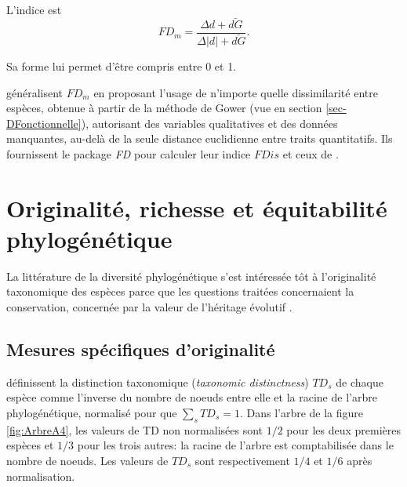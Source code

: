 \documentclass[
  11pt,
  french,
  a4paper,
  extrafontsizes,onecolumn,openright
  ]{memoir}
\begin{document}
L'indice est
\begin{equation}
  \label{eq:FDm}
  \mathit{FD}_{m} = \frac{\Delta d + \bar{dG}}{\Delta |d| +\bar{dG}}.
\end{equation}

Sa forme lui permet d'être compris entre 0 et 1.

\textcite{Laliberte2010} généralisent \(\mathit{FD}_{m}\) en proposant l'usage de n'importe quelle dissimilarité entre espèces, obtenue à partir de la méthode de Gower (vue en section \ref{sec-DFonctionnelle}), autorisant des variables qualitatives et des données manquantes, au-delà de la seule distance euclidienne entre traits quantitatifs.
Ils fournissent le package \emph{FD} pour calculer leur indice \(\mathit{FDis}\) et ceux de
\textcite{Villeger2008a}.

\hypertarget{originalituxe9-richesse-et-uxe9quitabilituxe9-phyloguxe9nuxe9tique}{%
\section{Originalité, richesse et équitabilité phylogénétique}\label{originalituxe9-richesse-et-uxe9quitabilituxe9-phyloguxe9nuxe9tique}}

La littérature de la diversité phylogénétique s'est intéressée tôt à l'originalité taxonomique des espèces parce que les questions traitées concernaient la conservation, concernée par la valeur de l'héritage évolutif \autocite{Faith2008}.

\hypertarget{mesures-spuxe9cifiques-doriginalituxe9}{%
\subsection{Mesures spécifiques d'originalité}\label{mesures-spuxe9cifiques-doriginalituxe9}}

\textcite{Vane-Wright1991} définissent la distinction taxonomique (\emph{taxonomic distinctness}) \(\mathit{TD}_s\) de chaque espèce comme l'inverse du nombre de noeuds entre elle et la racine de l'arbre phylogénétique, normalisé pour que \(\sum_s{\mathit{TD}_s} = 1\).
Dans l'arbre de la figure \ref{fig:ArbreA4}, les valeurs de TD non normalisées sont \({1}/{2}\) pour les deux premières espèces et \({1}/{3}\) pour les trois autres: la racine de l'arbre est comptabilisée dans le nombre de noeuds.
Les valeurs de \(\mathit{TD}_s\) sont respectivement \({1}/{4}\) et \({1}/{6}\) après normalisation.



\scriptsize
\end{document}
